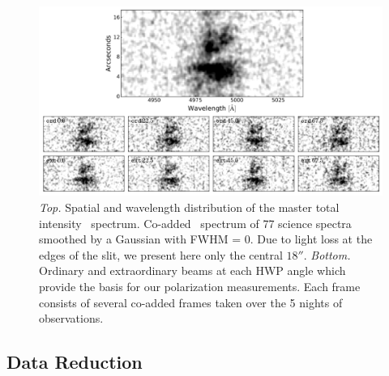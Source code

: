\begin{figure}
\begin{center}
\includegraphics[width=\linewidth]{Figures/lyapol/f1_f7_combo.pdf}
\caption[Science frames for \lya~polarimetry of LAB1]{\emph{Top.} Spatial and wavelength distribution of the master total intensity \lya~spectrum. Co-added \lya~spectrum of 77 science spectra smoothed by a Gaussian with FWHM = 0. Due to light loss at the edges of the slit, we present here only the central $18''$. \emph{Bottom.} Ordinary and extraordinary beams at each HWP angle which provide the basis for our polarization measurements. Each frame consists of several co-added frames taken over the 5 nights of observations.}
\label{fig: scienceframes and totint}
\end{center}
\end{figure}


\subsection{Data Reduction}\label{sec: dataredux}

